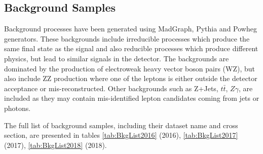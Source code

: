 \subsection{Background Samples}

Background processes have been generated using MadGraph, Pythia and Powheg
generators. These backgrounds include irreducible processes which produce the
same final state as the signal and also reducible processes which produce
different physics, but lead to similar signals in the detector. The backgrounds
are dominated by the production of electroweak heavy vector boson pairs (WZ), but
also include ZZ production where one of the leptons is either outside the detector
acceptance or mis-reconstructed. Other backgrounds such as Z+Jets, $t\bar{t}$,
$Z\gamma$, are included as they may contain mis-identified lepton candidates
coming from jets or photons.

The full list of background samples, including their dataset name and cross
section, are presented in tables \ref{tab:BkgList2016} (2016),
\ref{tab:BkgList2017}(2017), \ref{tab:BkgList2018} (2018).

